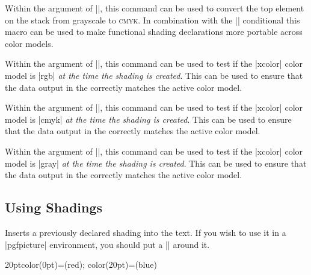 \begin{command}{\pgffuncshadinggraytocmyk}
  Within the  argument of
  |\pgfdeclarefunctionalshading|, this command can be used to convert the
  top element on the stack from grayscale to \textsc{cmyk}. In combination
  with the |\ifpgfshadingmodelcmyk| conditional this macro can be used to
  make functional shading declarations more portable across color models.
\end{command}

{\let\ifpgfshadingmodelrgb=\relax
 \let\ifpgfshadingmodelcmyk=\relax
 \let\ifpgfshadingmodelgray=\relax
 \begin{command}{\ifpgfshadingmodelrgb}
   Within the  argument of
   |\pgfdeclarefunctionalshading|, this command can be used to test if the
   |xcolor| color model is |rgb| \emph{at the time the shading is created}.
   This can be used to ensure that the data output in the  correctly matches the active color model.
 \end{command}

 \begin{command}{\ifpgfshadingmodelcmyk}
   Within the  argument of
   |\pgfdeclarefunctionalshading|, this command can be used to test if the
   |xcolor| color model is |cmyk| \emph{at the time the shading is created}.
   This can be used to ensure that the data output in the  correctly matches the active color model.
 \end{command}

 \begin{command}{\ifpgfshadingmodelgray}
   Within the  argument of
   |\pgfdeclarefunctionalshading|, this command can be used to test if the
   |xcolor| color model is |gray| \emph{at the time the shading is created}.
   This can be used to ensure that the data output in the  correctly matches the active color model.
 \end{command}
}

\subsection{Using Shadings}
\label{section-shading-a-path}

\begin{command}{\pgfuseshading{}}
    Inserts a previously declared shading into the text. If you wish to use it
    in a |pgfpicture| environment, you should put a |\pgftext| around it.
\begin{codeexample}[]
\begin{pgfpicture}
    {20pt}{color(0pt)=(red); color(20pt)=(blue)}
\end{pgfpicture}
\end{codeexample}
\end{command}

